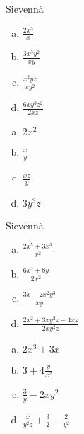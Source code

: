 \begin{tehtava}
Sievennä
	\begin{enumerate}[a)]
	\item $\frac{2x^3}{x}$
	\item $\frac{3x^3y^2}{xy}$
	\item $\frac{x^2yz}{xy^2}$
	\item $\frac{6xy^3z^2}{2xz}$
	\end{enumerate}

\begin{vastaus}
	\begin{enumerate}[a)]
	\item $2x^2$
	\item $\frac{x}{y}$
	\item $\frac{xz}{y}$
	\item $3y^3z$
	\end{enumerate}
\end{vastaus}
\end{tehtava}

\begin{tehtava}
Sievennä
	\begin{enumerate}[a)]
	\item $\frac{2x^5+3x^3}{x^2}$
	\item $\frac{6x^2+8y}{2x^2}$
	\item $\frac{3x-2x^2y^3}{xy}$
	\item $\frac{2x^2+3xy^2z-4xz}{2xy^2z}$
	\end{enumerate}

\begin{vastaus}
	\begin{enumerate}[a)]
	\item $2x^3+3x$
	\item $3+4 \frac{y}{x^2}$
	\item $\frac{3}{y} - 2xy^2$
	\item $\frac{x}{y^2z} + \frac{3}{2} + \frac{2}{y^2}$
	\end{enumerate}
\end{vastaus}
\end{tehtava}

